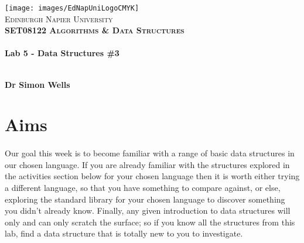 \documentclass[10pt, a4paper, twosize]{article}
\begin{document}

\begin{titlepage}
\vspace*{5cm}
\begin{center}
\texttt{[image: images/EdNapUniLogoCMYK]}~\\[1cm]

\textsc{\Large Edinburgh Napier University}\\[1.5cm]

\textsc{\LARGE \bfseries SET08122 Algorithms \& Data Structures}\\[0.5cm]

\hrulefill \\[0.4cm]
{\huge \bfseries Lab 5 - Data Structures \#3 \\[0.4cm] }
\hrulefill \\[1.5cm]

\begin{minipage}{0.4\textwidth}
\begin{flushleft} \large
\textbf{Dr Simon Wells} \\
\end{flushleft}
\end{minipage}

\vfill

\end{center}
\end{titlepage}




%

\section{Aims}
\paragraph{} Our goal this week is to become familiar with a range of basic data structures in our chosen language. If you are already familiar with the structures explored in the activities section below for your chosen language then it is worth either trying a different language, so that you have something to compare against, or else, exploring the standard library for your chosen language to discover something you didn't already know. Finally, any given introduction to data structures will only and can only scratch the surface; so if you know all the structures from this lab, find a data structure that is totally new to you to investigate.
\end{document}
